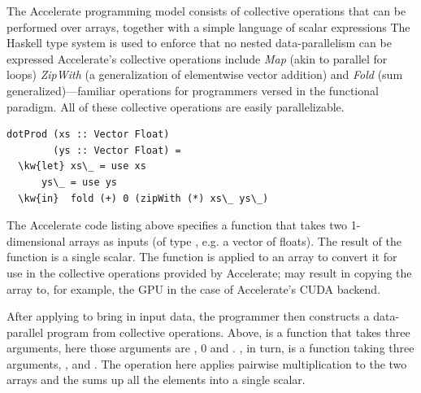 The Accelerate programming model consists of collective 
operations that can be performed over arrays, together with a simple 
language of scalar expressions
The Haskell type 
system is used to enforce that no nested data-parallelism can be expressed 
\fi{}
Accelerate's collective operations include {\em Map} (akin to parallel
for loops) {\em ZipWith} (a generalization of elementwise vector addition) and 
{\em Fold} (sum generalized)---familiar operations for programmers versed in the functional paradigm.
All of these collective operations are easily parallelizable. 

\begin{verbatim}
dotProd (xs :: Vector Float) 
        (ys :: Vector Float) = 
  \kw{let} xs\_ = use xs 
      ys\_ = use ys 
  \kw{in}  fold (+) 0 (zipWith (*) xs\_ ys\_) 
\end{verbatim}

The Accelerate code listing above specifies a function that takes two 1-dimensional 
arrays as inputs (of type , e.g. a vector of floats). The result of the function is a single
scalar. 
The  function is applied to an array to convert it 
for use in the collective operations provided by Accelerate;
may result in
copying the array to, for example, the GPU in the case of Accelerate's 
CUDA backend.  

After applying  to bring in input data, the programmer then
constructs a data-parallel program from collective operations.
Above,  is a function that takes three arguments, 
here those arguments are \cde{(+)},  $0$ and . 
, in turn, is a function taking three arguments, \cde{(*)}, 
 and . The  operation here applies pairwise 
multiplication to the two arrays and the  sums up all the elements 
into a single scalar. 


